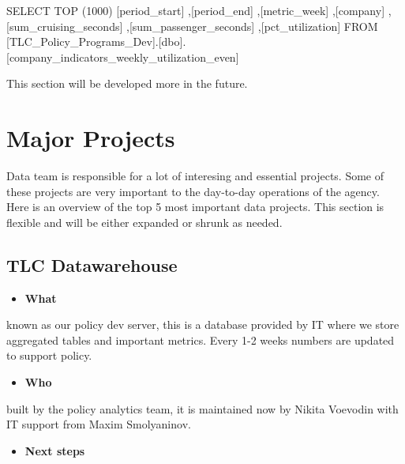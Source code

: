 \documentclass[
]{book}
\newenvironment{Shaded}{\begin{snugshade}}{\end{snugshade}}
\newcommand{\DecValTok}[1]{\textcolor[rgb]{0.00,0.00,0.81}{#1}}
\newcommand{\FunctionTok}[1]{\textcolor[rgb]{0.00,0.00,0.00}{#1}}
\newcommand{\NormalTok}[1]{#1}
\providecommand{\tightlist}{%
  \setlength{\itemsep}{0pt}\setlength{\parskip}{0pt}}
\begin{document}
\begin{Shaded}
\begin{Highlighting}[]
\NormalTok{SELECT }\FunctionTok{TOP}\NormalTok{ (}\DecValTok{1000}\NormalTok{) [period\_start]}
\NormalTok{      ,[period\_end]}
\NormalTok{      ,[metric\_week]}
\NormalTok{      ,[company]}
\NormalTok{      ,[sum\_cruising\_seconds]}
\NormalTok{      ,[sum\_passenger\_seconds]}
\NormalTok{      ,[pct\_utilization]}
\NormalTok{  FROM [TLC\_Policy\_Programs\_Dev].[dbo].[company\_indicators\_weekly\_utilization\_even]}
\end{Highlighting}
\end{Shaded}

This section will be developed more in the future.

\hypertarget{major-projects}{%
\chapter{Major Projects}\label{major-projects}}

Data team is responsible for a lot of interesing and essential projects. Some of these projects are very important to the day-to-day operations of the agency. Here is an overview of the top 5 most important data projects. This section is flexible and will be either expanded or shrunk as needed.

\hypertarget{tlc-datawarehouse-1}{%
\section{TLC Datawarehouse}\label{tlc-datawarehouse-1}}

\begin{itemize}
\tightlist
\item
  \textbf{What}
\end{itemize}

known as our policy dev server, this is a database provided by IT where we store aggregated tables and important metrics. Every 1-2 weeks numbers are updated to support policy.

\begin{itemize}
\tightlist
\item
  \textbf{Who}
\end{itemize}

built by the policy analytics team, it is maintained now by Nikita Voevodin with IT support from Maxim Smolyaninov.

\begin{itemize}
\tightlist
\item
  \textbf{Next steps}
\end{itemize}
\end{document}
